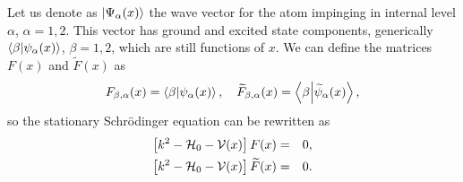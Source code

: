 %
Let us denote as  $|{\Psi}_\alpha(x)\rangle$  the wave vector for the atom impinging in internal level $\alpha$, $\alpha=1,2$.
This vector has ground and excited state components, generically $\braket{\beta}{\psi_{\alpha}(x)}$, $\beta=1,2$, which are still functions of $x$.
We can define the matrices $F(x)$ and $\widetilde{F}(x)$ as
%
\begin{eqnarray}
	F_{\beta,\alpha} (x) = \braket{\beta}{\psi_{\alpha}(x)},
	\quad
	\widetilde{F}_{\beta,\alpha} (x) = \braket{\beta}{\widetilde{\psi}_{\alpha}(x)},
\end{eqnarray}
%
so the stationary Schr\"odinger equation can be rewritten as
%
\begin{eqnarray}
	\left[k^2-{\cal H}_{0}-{\cal V}(x)\right]F(x)&=&0,
	\nonumber\\
	\left[k^2-{\cal H}_{0}-{\cal V}(x)\right]\widetilde{F}(x)&=&0.
\end{eqnarray}
%


